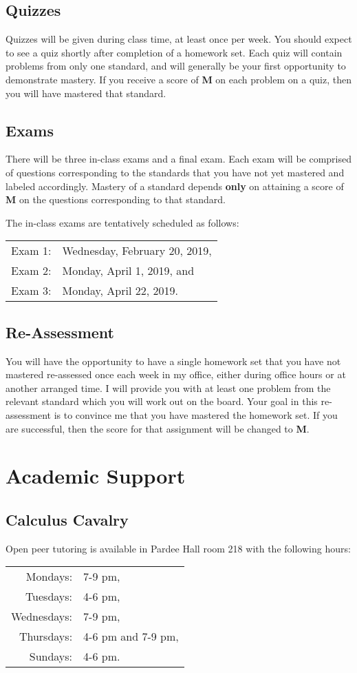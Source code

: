 \documentclass[12pt]{amsart}
\begin{document}
\subsection*{Quizzes}
Quizzes will be given during class time, at least once per week.
You should expect to see a quiz shortly after completion of a homework set.
Each quiz will contain problems from only one standard, and will generally be your first opportunity to demonstrate mastery.
If you receive a score of \textbf{M} on each problem on a quiz, then you will have mastered that standard.

\subsection*{Exams}
There will be three in-class exams and a final exam.
Each exam will be comprised of questions corresponding to the standards that you have not yet mastered and labeled accordingly.
Mastery of a standard depends \textbf{only} on attaining a score of \textbf{M} on the questions corresponding to that standard.

The in-class exams are tentatively scheduled as follows:
\begin{center}
  \begin{tabular}{rl}
    Exam 1: & Wednesday, February 20, 2019,\\
    Exam 2: & Monday, April 1, 2019, and\\
    Exam 3: & Monday, April 22, 2019.
  \end{tabular}
\end{center}

\subsection*{Re-Assessment}
You will have the opportunity to have a single homework set that you have not mastered re-assessed once each week in my office, either during office hours or at another arranged time.
I will provide you with at least one problem from the relevant standard which you will work out on the board.
Your goal in this re-assessment is to convince me that you have mastered the homework set.
If you are successful, then the score for that assignment will be changed to \textbf{M}.

\section*{Academic Support}
\subsection*{Calculus Cavalry}
\noindent
Open peer tutoring is available in Pardee Hall room 218 with the following hours:
\begin{center}
  \begin{tabular}{rl}
    Mondays: &7-9 pm,\\
    Tuesdays: &4-6 pm,\\
    Wednesdays: &7-9 pm,\\
    Thursdays: &4-6 pm and 7-9 pm,\\
    Sundays: &4-6 pm.
  \end{tabular}
\end{center}
\end{document}

